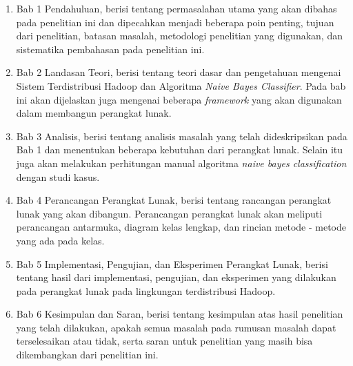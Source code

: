 \begin{enumerate}
	\item Bab 1 Pendahuluan, berisi tentang permasalahan utama yang akan dibahas pada penelitian ini dan dipecahkan menjadi beberapa poin penting, tujuan dari penelitian, batasan masalah, metodologi penelitian yang digunakan, dan sistematika pembahasan pada penelitian ini. 
	\item Bab 2 Landasan Teori, berisi tentang teori dasar dan pengetahuan mengenai Sistem Terdistribusi Hadoop dan Algoritma \textit{Naive Bayes Classifier}. Pada bab ini akan dijelaskan juga mengenai beberapa \textit{framework} yang akan digunakan dalam membangun perangkat lunak.
	\item Bab 3 Analisis, berisi tentang analisis masalah yang telah dideskripsikan pada Bab 1 dan menentukan beberapa kebutuhan dari perangkat lunak. Selain itu juga akan melakukan perhitungan manual algoritma \textit{naive bayes classification} dengan studi kasus.
	\item Bab 4 Perancangan Perangkat Lunak, berisi tentang rancangan perangkat lunak yang akan dibangun. Perancangan perangkat lunak akan meliputi perancangan antarmuka, diagram kelas lengkap, dan rincian metode - metode yang ada pada kelas.
	\item Bab 5 Implementasi, Pengujian, dan Eksperimen Perangkat Lunak, berisi tentang hasil dari implementasi, pengujian, dan eksperimen yang dilakukan pada perangkat lunak pada lingkungan terdistribusi Hadoop.
	\item Bab 6 Kesimpulan dan Saran, berisi tentang kesimpulan atas hasil penelitian yang telah dilakukan, apakah semua masalah pada rumusan masalah dapat terselesaikan atau tidak, serta saran untuk penelitian yang masih bisa dikembangkan dari penelitian ini.
\end{enumerate}
